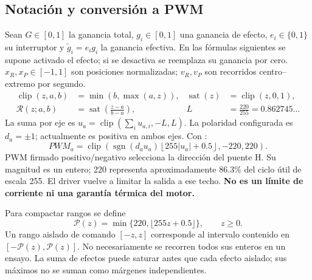 \documentclass[11pt,a4paper]{article}
\newcommand{\sat}{\operatorname{sat}}
\newcommand{\clip}{\operatorname{clip}}
\newcommand{\sgn}{\operatorname{sgn}}
\newcommand{\code}[1]{\texttt{\detokenize{#1}}}
\begin{document}
\subsection{Notación y conversión a PWM}
Sean $G\in[0,1]$ la ganancia total, $g_i\in[0,1]$ una ganancia de efecto, $e_i\in\{0,1\}$ su interruptor y $\widetilde g_i=e_i g_i$ la ganancia efectiva. En las fórmulas siguientes se supone activado el efecto; si se desactiva se reemplaza su ganancia por cero. $x_R,x_P\in[-1,1]$ son posiciones normalizadas; $v_R,v_P$ son recorridos centro--extremo por segundo.
\begin{align}
\clip(z,a,b)&=\min(b,\max(a,z)), & \sat(z)&=\clip(z,0,1),\\
\mathcal R(z;a,b)&=\sat\left(\frac{z-a}{b-a}\right),&L&=\frac{220}{255}=0.862745\ldots
\end{align}
La suma por eje es $u_a=\clip(\sum_i u_{a,i},-L,L)$. La polaridad configurada es $d_a=\pm1$; actualmente es positiva en ambos ejes. Con \code{PWM_MAX=255}:
\begin{equation}
 PWM_a=\clip\left(\sgn(d_au_a)\left\lfloor255|u_a|+0.5\right\rfloor,-220,220\right).
\end{equation}
PWM firmado positivo/negativo selecciona la dirección del puente H. Su magnitud es un entero; 220 representa aproximadamente 86.3\% del ciclo útil de escala 255. El driver vuelve a limitar la salida a ese techo. \textbf{No es un límite de corriente ni una garantía térmica del motor.}

Para compactar rangos se define
\begin{equation}\mathcal P(z)=\min\{220,\lfloor255z+0.5\rfloor\},\qquad z\geq0.\end{equation}
Un rango aislado de comando $[-z,z]$ corresponde al intervalo contenido en $[-\mathcal P(z),\mathcal P(z)]$. No necesariamente se recorren todos sus enteros en un ensayo. La suma de efectos puede saturar antes que cada efecto aislado; sus máximos no se suman como márgenes independientes.
\end{document}
